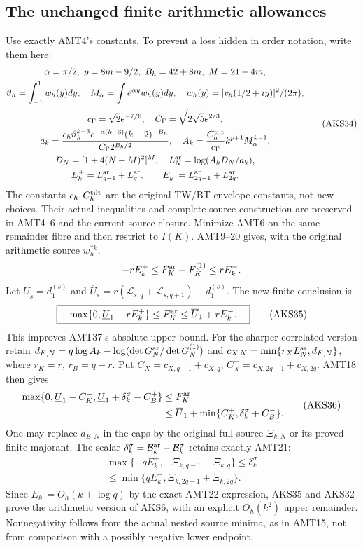 \documentclass[11pt,a4paper]{article}
\begin{document}
\subsection{The unchanged finite arithmetic allowances}
Use exactly AMT4's constants. To prevent a loss hidden in order notation,
write them here:
\[
\begin{gathered}
 \alpha=\pi/2,\ p=8m-9/2,\ B_h=42+8m,\ M=21+4m,\\
 \vartheta_h=\int_{-1}^1w_h(y)dy,\quad
 M_\alpha=\int e^{\alpha y}w_h(y)dy,\quad
 w_h(y)=|v_h(1/2+iy)|^2/(2\pi),\\
 c_\Gamma=\sqrt2e^{-7/6},\quad C_\Gamma=\sqrt{2\sqrt5}e^{2/3},\\
 a_k=\frac{c_h\vartheta_h^{k-3}e^{-\alpha(k-3)}(k-2)^{-B_h}}
                    {C_\Gamma2^{B_h/2}},\quad
 A_k=\frac{C_h^{\rm tilt}}{c_\Gamma}k^{p+1}M_\alpha^{k-1},\\
 D_N=[1+4(N+M)^2]^M,\quad L_N^{\rm ar}=\log(A_kD_N/a_k),\\
 E_k^+=L_{q-1}^{\rm ar}+L_q^{\rm ar},\qquad
 E_k^-=L_{2q-1}^{\rm ar}+L_{2q}^{\rm ar}.
\end{gathered}\tag{AKS34}
\]
The constants $c_h,C_h^{\rm tilt}$ are the original TW/BT envelope
constants, not new choices. Their actual inequalities and complete
source construction are preserved in AMT4--6 and the current source
closure. Minimize AMT6 on the same remainder fibre and then restrict to
$I(K)$. AMT9--20 gives, with the original arithmetic source $w_h^{*k}$,
\[
 -rE_k^+\le F_K^{\rm ar}-F_K^{(1)}\le rE_k^-.
\]
Let $\underline U_s=d_1^{(s)}$ and
$\overline U_s=r(\mathcal L_{s,q}+\mathcal L_{s,q+1})-d_1^{(s)}$. The new finite conclusion is
\[
 \boxed{\quad
 \max\{0,\underline U_1-rE_k^+\}\le F_K^{\rm ar}
                  \le\overline U_1+rE_k^-.
 \quad}\tag{AKS35}
\]
This improves AMT37's absolute upper bound. For the sharper correlated
version retain $d_{E,N}=q\log A_k-
\log(\det G_N^{\rm ar}/\det G_N^{(1)})$ and
$c_{X,N}=\min\{r_XL_N^{\rm ar},d_{E,N}\}$, where $r_K=r$, $r_B=q-r$.
Put $C_X^-=c_{X,q-1}+c_{X,q}$,
$C_X^+=c_{X,2q-1}+c_{X,2q}$. AMT18 then gives
\[
\begin{split}
 \max\{0,\underline U_1-C_K^-,
                  \underline U_1+\delta_k^\sigma-C_B^+\}
 &\le F_K^{\rm ar}\\
 &\le\overline U_1+
            \min\{C_K^+,\delta_k^\sigma+C_B^-\}.
\end{split}\tag{AKS36}
\]
One may replace $d_{E,N}$ in the caps by the original full-source
$\Xi_{k,N}$ or its proved finite majorant. The scalar
$\delta_k^\sigma=\mathcal B_k^{\rm ar}-\mathcal B_k^\sigma$ retains
exactly AMT21:
\[
\begin{gathered}
 \max\{-qE_k^+,-\Xi_{k,q-1}-\Xi_{k,q}\}
       \le\delta_k^\sigma\\
       \le\min\{qE_k^-,\Xi_{k,2q-1}+\Xi_{k,2q}\}.
\end{gathered}\tag{AKS37}
\]
Since $E_k^\pm=O_h(k+\log q)$ by the exact AMT22 expression, AKS35 and
AKS32 prove the arithmetic version of AKS6, with an explicit
$O_h(k^2)$ upper remainder. Nonnegativity follows from the actual
nested source minima, as in AMT15, not from comparison with a possibly
negative lower endpoint.
\end{document}
